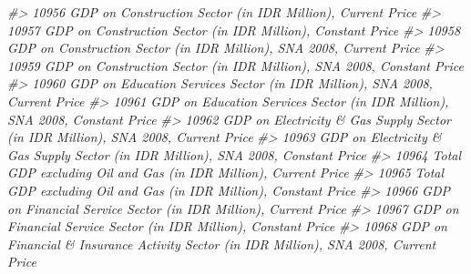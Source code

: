 \documentclass[
]{bxjsbook}
\newenvironment{Shaded}{\begin{snugshade}}{\end{snugshade}}
\newcommand{\CommentTok}[1]{\textcolor[rgb]{0.56,0.35,0.01}{\textit{#1}}}
\theoremstyle{definition}
\theoremstyle{definition}
\theoremstyle{definition}
\theoremstyle{definition}
\theoremstyle{remark}
\begin{document}
\begin{Shaded}
\begin{Highlighting}[]
\CommentTok{\#\textgreater{} 10956                                                                                                                GDP on Construction Sector (in IDR Million), Current Price}
\CommentTok{\#\textgreater{} 10957                                                                                                               GDP on Construction Sector (in IDR Million), Constant Price}
\CommentTok{\#\textgreater{} 10958                                                                                                      GDP on Construction Sector (in IDR Million), SNA 2008, Current Price}
\CommentTok{\#\textgreater{} 10959                                                                                                     GDP on Construction Sector (in IDR Million), SNA 2008, Constant Price}
\CommentTok{\#\textgreater{} 10960                                                                                                GDP on Education Services Sector (in IDR Million), SNA 2008, Current Price}
\CommentTok{\#\textgreater{} 10961                                                                                               GDP on Education Services Sector (in IDR Million), SNA 2008, Constant Price}
\CommentTok{\#\textgreater{} 10962                                                                                          GDP on Electricity \& Gas Supply Sector (in IDR Million), SNA 2008, Current Price}
\CommentTok{\#\textgreater{} 10963                                                                                         GDP on Electricity \& Gas Supply Sector (in IDR Million), SNA 2008, Constant Price}
\CommentTok{\#\textgreater{} 10964                                                                                                           Total GDP excluding Oil and Gas (in IDR Million), Current Price}
\CommentTok{\#\textgreater{} 10965                                                                                                          Total GDP excluding Oil and Gas (in IDR Million), Constant Price}
\CommentTok{\#\textgreater{} 10966                                                                                                           GDP on Financial Service Sector (in IDR Million), Current Price}
\CommentTok{\#\textgreater{} 10967                                                                                                          GDP on Financial Service Sector (in IDR Million), Constant Price}
\CommentTok{\#\textgreater{} 10968                                                                                    GDP on Financial \& Insurance Activity Sector (in IDR Million), SNA 2008, Current Price}

\end{Highlighting}
\end{Shaded}
\end{document}

